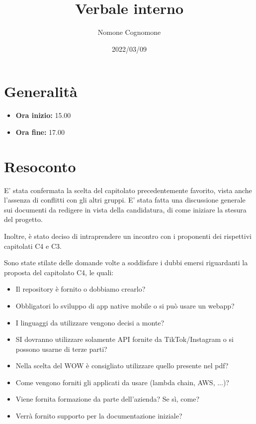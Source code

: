 \documentclass{classes/base}
\title{Verbale interno}
\date{2022/03/09}
\author{Nomone Cognomone}
\renewcommand{\maketitle}{
    
}
\begin{document}
    \maketitle

    \section{Generalità}
    \begin{itemize}
        \item \textbf{Ora inizio:} 15.00
        \item \textbf{Ora fine:} 17.00
    \end{itemize}

    \section{Resoconto}
    E' stata confermata la scelta del capitolato precedentemente favorito, vista anche l’assenza di conflitti con gli altri gruppi.
    E' stata fatta una discussione generale sui documenti da redigere in vista della candidatura, di come iniziare la stesura del progetto.

    Inoltre, è stato deciso di intraprendere un incontro con i proponenti dei rispettivi capitolati C4 e C3.
    
    Sono state stilate delle domande volte a soddisfare i dubbi emersi riguardanti la proposta del capitolato C4, le quali:
    \begin{itemize}
        \item  Il repository è fornito o dobbiamo crearlo?
        \item  Obbligatori lo sviluppo di app native mobile o si può usare un webapp?
        \item  I linguaggi da utilizzare vengono decisi a monte?
        \item  SI dovranno utilizzare solamente API fornite da TikTok/Instagram o si possono usarne di terze parti?
        \item  Nella scelta del WOW è consigliato utilizzare quello presente nel pdf?
        \item  Come vengono forniti gli applicati da usare (lambda chain, AWS, ...)?
        \item  Viene fornita formazione da parte dell'azienda? Se sì, come?
        \item  Verrà fornito supporto per la documentazione iniziale?
    \end{itemize}

    
\end{document}
